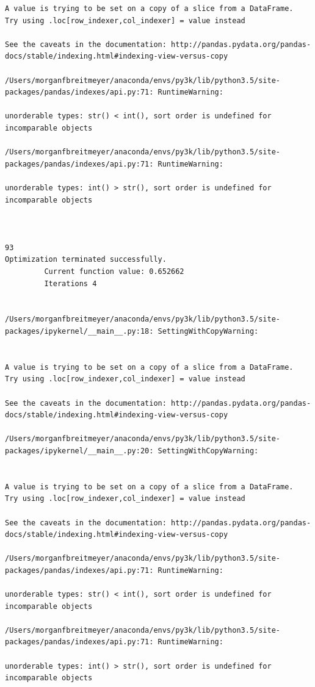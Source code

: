 \begin{lstlisting}
A value is trying to be set on a copy of a slice from a DataFrame.
Try using .loc[row_indexer,col_indexer] = value instead

See the caveats in the documentation: http://pandas.pydata.org/pandas-docs/stable/indexing.html#indexing-view-versus-copy

/Users/morganfbreitmeyer/anaconda/envs/py3k/lib/python3.5/site-packages/pandas/indexes/api.py:71: RuntimeWarning:

unorderable types: str() < int(), sort order is undefined for incomparable objects

/Users/morganfbreitmeyer/anaconda/envs/py3k/lib/python3.5/site-packages/pandas/indexes/api.py:71: RuntimeWarning:

unorderable types: int() > str(), sort order is undefined for incomparable objects



93
Optimization terminated successfully.
         Current function value: 0.652662
         Iterations 4


/Users/morganfbreitmeyer/anaconda/envs/py3k/lib/python3.5/site-packages/ipykernel/__main__.py:18: SettingWithCopyWarning:


A value is trying to be set on a copy of a slice from a DataFrame.
Try using .loc[row_indexer,col_indexer] = value instead

See the caveats in the documentation: http://pandas.pydata.org/pandas-docs/stable/indexing.html#indexing-view-versus-copy

/Users/morganfbreitmeyer/anaconda/envs/py3k/lib/python3.5/site-packages/ipykernel/__main__.py:20: SettingWithCopyWarning:


A value is trying to be set on a copy of a slice from a DataFrame.
Try using .loc[row_indexer,col_indexer] = value instead

See the caveats in the documentation: http://pandas.pydata.org/pandas-docs/stable/indexing.html#indexing-view-versus-copy

/Users/morganfbreitmeyer/anaconda/envs/py3k/lib/python3.5/site-packages/pandas/indexes/api.py:71: RuntimeWarning:

unorderable types: str() < int(), sort order is undefined for incomparable objects

/Users/morganfbreitmeyer/anaconda/envs/py3k/lib/python3.5/site-packages/pandas/indexes/api.py:71: RuntimeWarning:

unorderable types: int() > str(), sort order is undefined for incomparable objects




\end{lstlisting}
